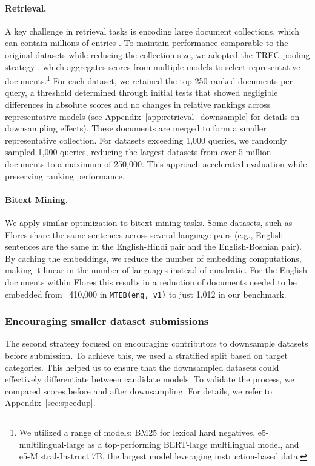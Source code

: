 \paragraph{Retrieval.} A key challenge in retrieval tasks is encoding large document collections, which can contain millions of entries \cite{nguyenhendriksen2024multimodal}. To maintain performance comparable to the original datasets while reducing the collection size, we adopted the TREC pooling strategy \citep{buckley2007bias,soboroff2003building}, which aggregates scores from multiple models to select representative documents.\footnote{We utilized a range of models: BM25 for lexical hard negatives, e5-multilingual-large as a top-performing BERT-large multilingual model, and e5-Mistral-Instruct 7B, the largest model leveraging instruction-based data.}  For each dataset, we retained the top 250 ranked documents per query, a threshold determined through initial tests that showed negligible differences in absolute scores and no changes in relative rankings across representative models (see Appendix~\ref{app:retrieval_downsample} for details on downsampling effects). These documents are merged to form a smaller representative collection. For datasets exceeding 1,000 queries, we randomly sampled 1,000 queries, reducing the largest datasets from over 5 million documents to a maximum of 250,000. This approach accelerated evaluation while preserving ranking performance.

\paragraph{Bitext Mining.} We apply similar optimization to bitext mining tasks. Some datasets, such as Flores \citep{nllb2022flores} share the same sentences across several language pairs (e.g., English sentences are the same in the English-Hindi pair and the English-Bosnian pair). By caching the embeddings, we reduce the number of embedding computations, making it linear in the number of languages instead of quadratic. For the English documents within Flores this results in a reduction of documents needed to be embedded from ~410,000 in \texttt{MTEB(eng, v1)} to just 1,012 in our benchmark.

\subsubsection{Encouraging smaller dataset submissions} 
\label{sec:smaller-dataset-submissions}
The second strategy focused on encouraging contributors to downsample datasets before submission. To achieve this, we used a stratified split based on target categories. This helped us to ensure that the downsampled datasets could effectively differentiate between candidate models. To validate the process, we compared scores before and after downsampling. For details, we refer to Appendix~\ref{sec:speedup}.

